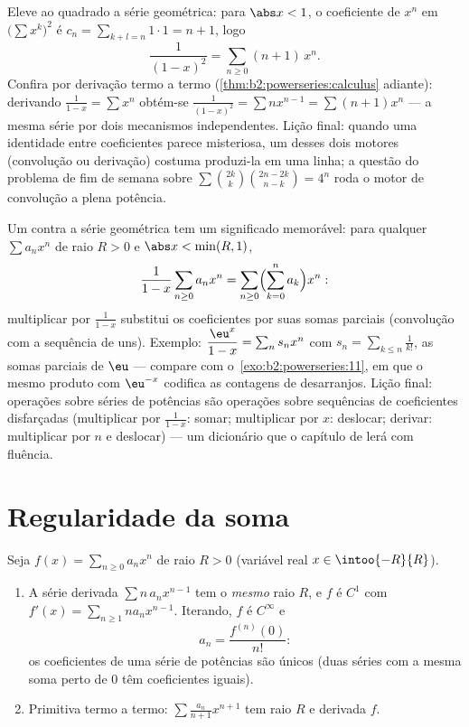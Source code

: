 \begin{example}\label{ex:b2:powerseries:cauchysquare}
Eleve ao quadrado a série geométrica: para $\abs x < 1$, o coeficiente
de $x^n$ em $\bigl(\sum x^k\bigr)^2$ é $c_n = \sum_{k+l=n}
1\cdot1 = n + 1$, logo
\[
\frac{1}{(1-x)^2} = \sum_{n\geq0}(n+1)\,x^n .
\]
Confira por derivação termo a termo
(\cref{thm:b2:powerseries:calculus} adiante): derivando
$\frac{1}{1-x} = \sum x^n$ obtém-se $\frac{1}{(1-x)^2} = \sum
nx^{n-1} = \sum(n+1)x^n$ --- a mesma série por dois
mecanismos independentes. Lição final: quando uma identidade entre
coeficientes parece misteriosa, um desses dois motores (convolução ou
derivação) costuma produzi-la em uma linha; a questão do problema de
fim de semana sobre $\sum\binom{2k}k\binom{2n-2k}{n-k} = 4^n$
roda o motor de convolução a plena potência.
\end{example}

\begin{example}\label{ex:b2:powerseries:partialsums}
Um  contra a série geométrica tem um
significado memorável: para qualquer $\sum a_nx^n$ de raio $R > 0$ e $\abs x <
\min(R, 1)$,
\[
\frac{1}{1-x}\sum_{n\geq0}a_nx^n
= \sum_{n\geq0}\Bigl(\sum_{k=0}^{n}a_k\Bigr)x^n :
\]
multiplicar por $\frac{1}{1-x}$ substitui os coeficientes por
suas somas parciais (convolução com a sequência de uns).
Exemplo: $\dfrac{\eu^x}{1-x} = \sum_n s_n x^n$ com $s_n =
\sum_{k\leq n}\frac{1}{k!}$, as somas parciais de $\eu$ ---
compare com o~\cref{exo:b2:powerseries:11}, em que o mesmo produto
com $\eu^{-x}$ codifica as contagens de desarranjos. Lição
final: operações sobre séries de potências são operações sobre
sequências de coeficientes disfarçadas (multiplicar por $\frac1{1-x}$:
somar; multiplicar por $x$: deslocar; derivar: multiplicar por $n$
e deslocar) --- um dicionário que o capítulo de 
lerá com fluência.
\end{example}

\section{Regularidade da soma}

\begin{theorem}\label{thm:b2:powerseries:calculus}
Seja $f(x) = \sum_{n\geq0} a_n x^n$ de raio $R > 0$ (variável
real $x \in \intoo{-R}{R}$).
\begin{enumerate}
  \item A série derivada $\sum n\,a_n x^{n-1}$ tem o \emph{mesmo}
        raio $R$, e $f$ é $C^1$ com $f'(x) = \sum_{n \geq 1}
        n a_n x^{n-1}$. Iterando, $f$ é $C^\infty$ e
        \[
        a_n = \frac{f^{(n)}(0)}{n!} :
        \]
        os coeficientes de uma série de potências são únicos (duas séries
        com a mesma soma perto de $0$ têm coeficientes iguais).
  \item Primitiva termo a termo: $\sum \frac{a_n}{n+1}x^{n+1}$ tem
        raio $R$ e derivada $f$.
\end{enumerate}
\end{theorem}

